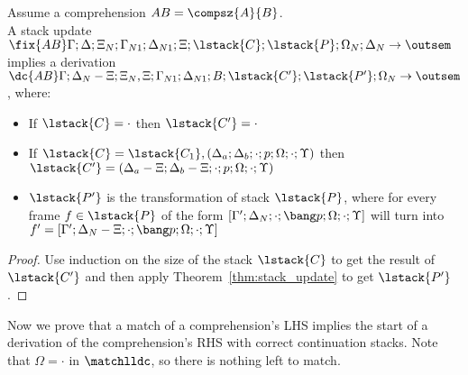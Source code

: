 \begin{theorem}\label{thm:from_update_to_derivation}

Assume a comprehension $AB = \compsz{A}{B}$. \\ A stack update
$\fix{AB} \Gamma; \Delta; \Xi_N; \Gamma_{N1}; \Delta_{N1}; \Xi; \lstack{C};
\lstack{P}; \Omega_N; \Delta_N \rightarrow \outsem$ implies a derivation \texttab$\dc{AB}
\Gamma; \Delta_N - \Xi; \Xi_N, \Xi; \Gamma_{N1}; \Delta_{N1}; B; \lstack{C'} ;
\lstack{P'}; \Omega_N \rightarrow \outsem$, where:

\begin{itemize}[leftmargin=*]
   \item If $\lstack{C} = \cdot$ then $\lstack{C'} = \cdot$

   \item If $\lstack{C} = \lstack{C_1}, (\Delta_a; \Delta_b; \cdot; p; \Omega; \cdot; \Upsilon)$
   then $\lstack{C'} = (\Delta_a - \Xi; \Delta_b - \Xi; \cdot; p; \Omega; \cdot;
         \Upsilon)$

   \item $\lstack{P'}$ is the transformation of stack $\lstack{P}$, where for every frame $f \in
   \lstack{P}$ of the form $[\Gamma'; \Delta_N; \cdot; \bang p; \Omega; \cdot; \Upsilon]$
   will turn into $f' = [\Gamma';\Delta_N-\Xi;\cdot;\bang p;\Omega;\cdot;\Upsilon]$

\end{itemize}
\end{theorem}
\begin{proof}
Use induction on the size of the stack $\lstack{C}$ to get the result of
$\lstack{C'}$ and then apply Theorem~\ref{thm:stack_update} to get
$\lstack{P'}$.
\end{proof}


Now we prove that a match of a comprehension's LHS implies the start of a
derivation of the comprehension's RHS with correct continuation stacks. Note
that $\Omega = \cdot$ in $\matchlldc$, so there is nothing left to match.

